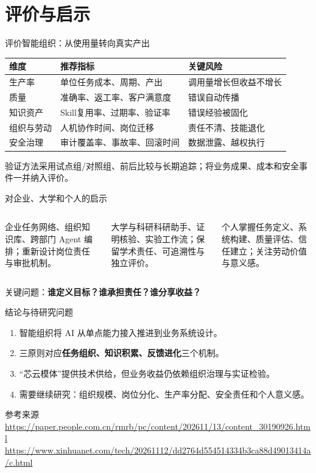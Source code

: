 \documentclass[aspectratio=169,10pt]{ctexbeamer}
\begin{document}
\section{评价与启示}
\begin{frame}{评价智能组织：从使用量转向真实产出}\small\begin{tabular}{p{2.1cm}p{4.4cm}p{5.1cm}}\toprule 维度 & 推荐指标 & 关键风险\\\midrule 生产率 & 单位任务成本、周期、产出 & 调用量增长但收益不增长\\ 质量 & 准确率、返工率、客户满意度 & 错误自动传播\\ 知识资产 & Skill复用率、过期率、验证率 & 错误经验被固化\\ 组织与劳动 & 人机协作时间、岗位迁移 & 责任不清、技能退化\\ 安全治理 & 审计覆盖率、事故率、回滚时间 & 数据泄露、越权执行\\\bottomrule\end{tabular}
\vspace{.35cm}\begin{block}{验证方法}采用试点组/对照组、前后比较与长期追踪；将业务成果、成本和安全事件一并纳入评价。\end{block}\end{frame}
\begin{frame}{对企业、大学和个人的启示}\begin{columns}[T]\begin{block}{企业}任务网络、组织知识库、跨部门 Agent 编排；重新设计岗位责任与审批机制。\end{block}\begin{block}{大学与科研}科研助手、证明核验、实验工作流；保留学术责任、可追溯性与独立评价。\end{block}\begin{block}{个人}掌握任务定义、系统构建、质量评估、信任建立；关注劳动价值与意义感。\end{block}\end{columns}
\vspace{.6cm}\centering\Large 关键问题：\textbf{谁定义目标？谁承担责任？谁分享收益？}\end{frame}
\begin{frame}{结论与待研究问题}\begin{enumerate}\item 智能组织将 AI 从单点能力接入推进到业务系统设计。\item 三原则对应\textbf{任务组织、知识积累、反馈进化}三个机制。\item “芯云模体”提供技术供给，但业务收益仍依赖组织治理与实证检验。\item 需要继续研究：组织规模、岗位分化、生产率分配、安全责任和个人意义感。\end{enumerate}
\vspace{.4cm}\begin{block}{参考来源}\scriptsize\url{https://paper.people.com.cn/rmrb/pc/content/202611/13/content_30190926.html}\\\url{https://www.xinhuanet.com/tech/20261112/dd2764d554514334b3ca88d49013414a/c.html}\end{block}\end{frame}
\end{document}
